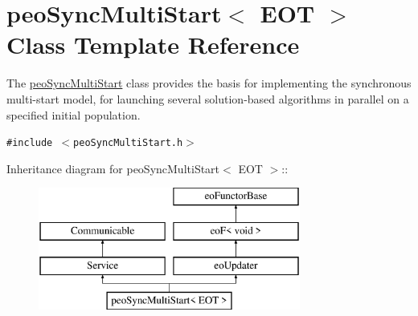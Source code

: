 \hypertarget{classpeoSyncMultiStart}{
\section{peo\-Sync\-Multi\-Start$<$ EOT $>$ Class Template Reference}
\label{classpeoSyncMultiStart}
}
The \hyperlink{classpeoSyncMultiStart}{peo\-Sync\-Multi\-Start} class provides the basis for implementing the synchronous multi-start model, for launching several solution-based algorithms in parallel on a specified initial population.  


{\tt \#include $<$peo\-Sync\-Multi\-Start.h$>$}

Inheritance diagram for peo\-Sync\-Multi\-Start$<$ EOT $>$::\begin{figure}[H]
\begin{center}
\leavevmode
\includegraphics[height=4cm]{classpeoSyncMultiStart}
\end{center}
\end{figure}
